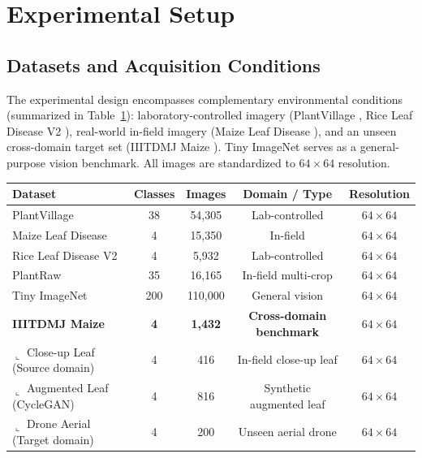 \documentclass[]{interact}
\theoremstyle{plain}
\theoremstyle{definition}
\theoremstyle{remark}
\begin{document}
\section{Experimental Setup}
\label{sec:experimental-setup}

\subsection{Datasets and Acquisition Conditions}

The experimental design encompasses complementary environmental conditions (summarized in Table~\ref{tab:datasets}): laboratory-controlled imagery (PlantVillage \citep{hughes2015plantvillage}, Rice Leaf Disease V2 \citep{rice_dataset2022}), real-world in-field imagery (Maize Leaf Disease \citep{mduma2023maize}), and an unseen cross-domain target set (IIITDMJ Maize \citep{iiitdmj2024dataset}). Tiny ImageNet \citep{le2015tiny} serves as a general-purpose vision benchmark. All images are standardized to $64 \times 64$ resolution.

\begin{table}[H]
\centering
\small
{}
{\begin{tabular}{lcccc} \toprule
\textbf{Dataset} & \textbf{Classes} & \textbf{Images} & \textbf{Domain / Type} & \textbf{Resolution} \\ \midrule
PlantVillage \citep{hughes2015plantvillage} & 38 & 54,305 & Lab-controlled & $64 \times 64$ \\
Maize Leaf Disease \citep{mduma2023maize} & 4 & 15,350 & In-field & $64 \times 64$ \\
Rice Leaf Disease V2 \citep{rice_dataset2022} & 4 & 5,932 & Lab-controlled & $64 \times 64$ \\
PlantRaw \citep{tongle2026plantraw} & 35 & 16,165 & In-field multi-crop & $64 \times 64$ \\
Tiny ImageNet \citep{le2015tiny} & 200 & 110,000 & General vision & $64 \times 64$ \\ \midrule
\textbf{IIITDMJ Maize} \citep{iiitdmj2024dataset} & \textbf{4} & \textbf{1,432} & \textbf{Cross-domain benchmark} & \textbf{$64 \times 64$} \\
\quad $\llcorner$ Close-up Leaf (Source domain) & 4 & 416 & In-field close-up leaf & $64 \times 64$ \\
\quad $\llcorner$ Augmented Leaf (CycleGAN) & 4 & 816 & Synthetic augmented leaf & $64 \times 64$ \\
\quad $\llcorner$ Drone Aerial (Target domain) & 4 & 200 & Unseen aerial drone & $64 \times 64$ \\ \bottomrule
\end{tabular}}
\label{tab:datasets}
\end{table}
\end{document}
